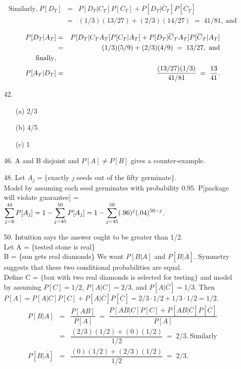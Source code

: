 \begin{enumerate}
\begin{eqnarray*}
	\end{eqnarray*} 
	\begin{eqnarray*}
	\text{Similarly,}\ P[D_T] &=& P[D_T\vert C_T]P[C_T] + P[D_T\vert \overline{C}_T]P[\overline{C}_T] \\
	&=& (1/3)(13/27) + (2/3)(14/27) \;=\; 41/81,\ \text{and} \\
	\end{eqnarray*}
	\begin{eqnarray*}
	P[D_T\vert A_T] &=& P[D_T\vert C_TA_T]P[C_T\vert A_T] + P[D_T\vert \overline{C}_TA_T]P[\overline{C}_T\vert A_T] \\
	&=& (1/3)(5/9) + (2/3)(4/9) \;=\; 13/27,\ \text{and} \\
	\text{finally},\hfill && \\
	P[A_T\vert D_T] &=& \dfrac{(13/27)(1/3)}{41/81} \;=\; \dfrac{13}{41}.
	\end{eqnarray*}

	\item[42.] \begin{enumerate}
		\item[(a)] 2/3 
		\item[(b)] 4/5
		\item[(c)] 1
	\end{enumerate}	
	
	\item[46.] A and B disjoint and $P[A] \ne P[B]$ gives a counter-example.
	
	\item[48.] Let $A_j = \{$exactly $j$ seeds out of the fifty germinate$\}$. \\
	Model by assuming each seed germinates with probability 0.95.  P[package will violate guarantee] = \\
	$\displaystyle \sum_{j=0}^{44} P[A_j] = 1 - \sum_{j=45}^{50}P[A_j] = 1 - \sum_{j=45}^{50}(.96)^j(.04)^{50-j}$.
	
	\item[50.] Intuition says the answer ought to be greater than 1/2. \\
	Let A = \{tested stone is real\} \\
	\phantom{Let} B = \{son gets real diamonds\}
	We want $P[B\vert A]$ and $P[B\vert \overline{A}]$.  Symmetry suggests that these two conditional probabilities are equal. \\
	Define C = $\{$box with two real diamonds is selected for testing$\}$ and model by assuming $P[C]=1/2$, $P[A\vert C]=2/3$, and $P[A\vert \overline{C}]=1/3$.
	Then $P[A]=P[A\vert C]P[C] + P[A\vert \overline{C}]P[\overline{C}] =2/3\cdot 1/2+1/3\cdot 1/2 = 1/2$. 
	\begin{eqnarray*}
	P[B\vert A] &=& \dfrac{P[AB]}{P[A]} \;=\; \dfrac{P[AB\vert C]P[C] + P[AB\vert \overline{C}]P[\overline{C}]}{P[A]} \\
	&=& \dfrac{(2/3)(1/2)+(0)(1/2)}{1/2} \;=\; 2/3.\ \text{Similarly} \\
	P[B\vert \overline{A}] &=& \dfrac{(0)(1/2)+(2/3)(1/2)}{1/2} \;=\; 2/3.
	\end{eqnarray*}
	

\end{enumerate}
